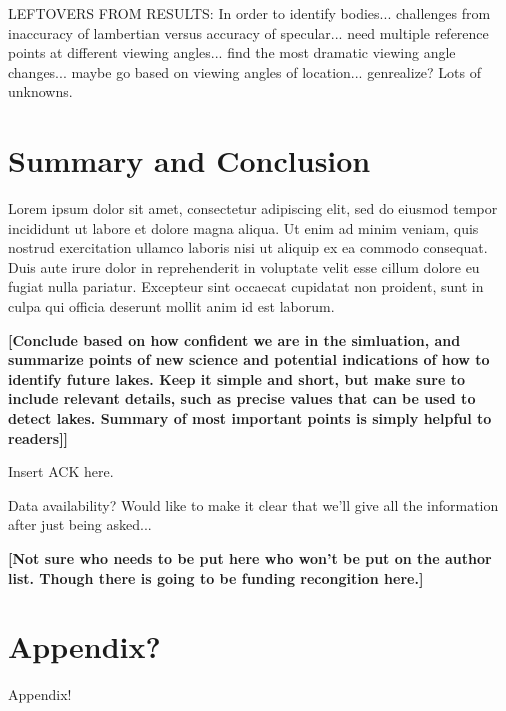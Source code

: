 \documentclass[twocolumn,linenumbers]{aastex631}
\begin{document}
\color{blue} LEFTOVERS FROM RESULTS: In order to identify bodies... challenges from inaccuracy of lambertian versus accuracy of specular... need multiple reference points at different viewing angles... find the most dramatic viewing angle changes... maybe go based on viewing angles of location... genrealize? Lots of unknowns. \color{black}

\section{Summary and Conclusion} \label{sec:conclusion}

Lorem ipsum dolor sit amet, consectetur adipiscing elit, sed do eiusmod tempor incididunt ut labore et dolore magna aliqua. Ut enim ad minim veniam, quis nostrud exercitation ullamco laboris nisi ut aliquip ex ea commodo consequat. Duis aute irure dolor in reprehenderit in voluptate velit esse cillum dolore eu fugiat nulla pariatur. Excepteur sint occaecat cupidatat non proident, sunt in culpa qui officia deserunt mollit anim id est laborum. 

\textbf{\color{red}[Conclude based on how confident we are in the simluation, and summarize points of new science and potential indications of how to identify future lakes. Keep it simple and short, but make sure to include relevant details, such as precise values that can be used to detect lakes. Summary of most important points is simply helpful to readers]]\color{black}}

\begin{acknowledgments}
Insert ACK here. 

\color{blue}Data availability? Would like to make it clear that we'll give all the information after just being asked...\color{black}

\textbf{\color{red}[Not sure who needs to be put here who won't be put on the author list. Though there is going to be funding recongition here.]\color{black}}
\end{acknowledgments}

\appendix

\section{Appendix?}

Appendix!

{}

\end{document}
